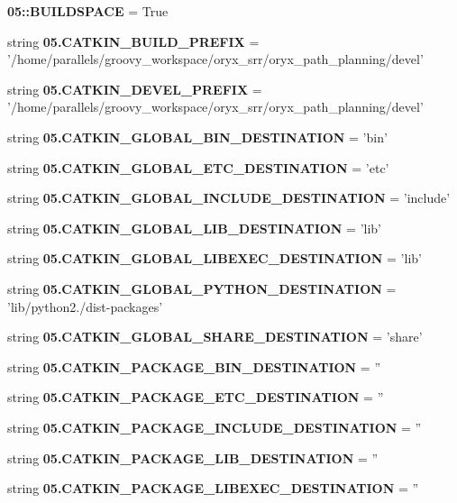 \begin{DoxyCompactItemize}
\item 
{\bf 05\-::\-B\-U\-I\-L\-D\-S\-P\-A\-C\-E} = \-True
\item 
string {\bf 05.\-C\-A\-T\-K\-I\-N\-\_\-\-B\-U\-I\-L\-D\-\_\-\-P\-R\-E\-F\-I\-X} = '/home/parallels/groovy\-\_\-workspace/oryx\-\_\-srr/oryx\-\_\-path\-\_\-planning/devel'
\item 
string {\bf 05.\-C\-A\-T\-K\-I\-N\-\_\-\-D\-E\-V\-E\-L\-\_\-\-P\-R\-E\-F\-I\-X} = '/home/parallels/groovy\-\_\-workspace/oryx\-\_\-srr/oryx\-\_\-path\-\_\-planning/devel'
\item 
string {\bf 05.\-C\-A\-T\-K\-I\-N\-\_\-\-G\-L\-O\-B\-A\-L\-\_\-\-B\-I\-N\-\_\-\-D\-E\-S\-T\-I\-N\-A\-T\-I\-O\-N} = 'bin'
\item 
string {\bf 05.\-C\-A\-T\-K\-I\-N\-\_\-\-G\-L\-O\-B\-A\-L\-\_\-\-E\-T\-C\-\_\-\-D\-E\-S\-T\-I\-N\-A\-T\-I\-O\-N} = 'etc'
\item 
string {\bf 05.\-C\-A\-T\-K\-I\-N\-\_\-\-G\-L\-O\-B\-A\-L\-\_\-\-I\-N\-C\-L\-U\-D\-E\-\_\-\-D\-E\-S\-T\-I\-N\-A\-T\-I\-O\-N} = 'include'
\item 
string {\bf 05.\-C\-A\-T\-K\-I\-N\-\_\-\-G\-L\-O\-B\-A\-L\-\_\-\-L\-I\-B\-\_\-\-D\-E\-S\-T\-I\-N\-A\-T\-I\-O\-N} = 'lib'
\item 
string {\bf 05.\-C\-A\-T\-K\-I\-N\-\_\-\-G\-L\-O\-B\-A\-L\-\_\-\-L\-I\-B\-E\-X\-E\-C\-\_\-\-D\-E\-S\-T\-I\-N\-A\-T\-I\-O\-N} = 'lib'
\item 
string {\bf 05.\-C\-A\-T\-K\-I\-N\-\_\-\-G\-L\-O\-B\-A\-L\-\_\-\-P\-Y\-T\-H\-O\-N\-\_\-\-D\-E\-S\-T\-I\-N\-A\-T\-I\-O\-N} = 'lib/python2./dist-\/packages'
\item 
string {\bf 05.\-C\-A\-T\-K\-I\-N\-\_\-\-G\-L\-O\-B\-A\-L\-\_\-\-S\-H\-A\-R\-E\-\_\-\-D\-E\-S\-T\-I\-N\-A\-T\-I\-O\-N} = 'share'
\item 
string {\bf 05.\-C\-A\-T\-K\-I\-N\-\_\-\-P\-A\-C\-K\-A\-G\-E\-\_\-\-B\-I\-N\-\_\-\-D\-E\-S\-T\-I\-N\-A\-T\-I\-O\-N} = ''
\item 
string {\bf 05.\-C\-A\-T\-K\-I\-N\-\_\-\-P\-A\-C\-K\-A\-G\-E\-\_\-\-E\-T\-C\-\_\-\-D\-E\-S\-T\-I\-N\-A\-T\-I\-O\-N} = ''
\item 
string {\bf 05.\-C\-A\-T\-K\-I\-N\-\_\-\-P\-A\-C\-K\-A\-G\-E\-\_\-\-I\-N\-C\-L\-U\-D\-E\-\_\-\-D\-E\-S\-T\-I\-N\-A\-T\-I\-O\-N} = ''
\item 
string {\bf 05.\-C\-A\-T\-K\-I\-N\-\_\-\-P\-A\-C\-K\-A\-G\-E\-\_\-\-L\-I\-B\-\_\-\-D\-E\-S\-T\-I\-N\-A\-T\-I\-O\-N} = ''
\item 
string {\bf 05.\-C\-A\-T\-K\-I\-N\-\_\-\-P\-A\-C\-K\-A\-G\-E\-\_\-\-L\-I\-B\-E\-X\-E\-C\-\_\-\-D\-E\-S\-T\-I\-N\-A\-T\-I\-O\-N} = ''

\end{DoxyCompactItemize}
